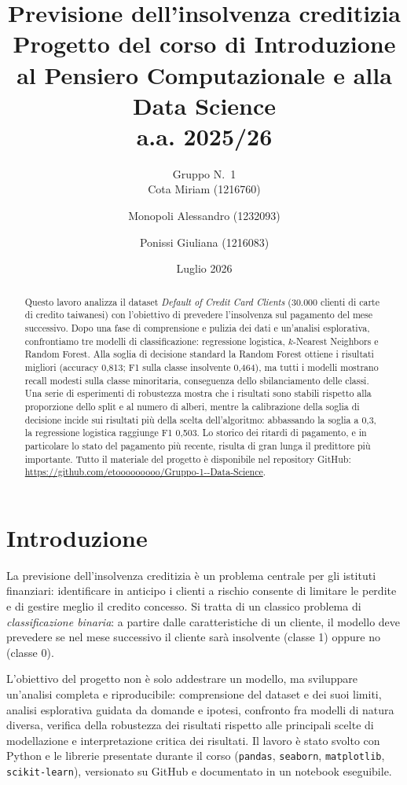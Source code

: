 \documentclass[11pt,a4paper]{article}
\title{Previsione dell'insolvenza creditizia\\
\large Progetto del corso di Introduzione al Pensiero Computazionale e alla Data Science\\
a.a. 2025/26}
\author{Gruppo N.~1\\[2pt]
\small Cota Miriam (1216760) \and \small Monopoli Alessandro (1232093) \and \small Ponissi Giuliana (1216083)}
\date{Luglio 2026}
\begin{document}
\maketitle

\begin{abstract}
Questo lavoro analizza il dataset \emph{Default of Credit Card Clients} (30.000 clienti di carte di credito taiwanesi) con l'obiettivo di prevedere l'insolvenza sul pagamento del mese successivo. Dopo una fase di comprensione e pulizia dei dati e un'analisi esplorativa, confrontiamo tre modelli di classificazione: regressione logistica, $k$-Nearest Neighbors e Random Forest. Alla soglia di decisione standard la Random Forest ottiene i risultati migliori (accuracy 0,813; F1 sulla classe insolvente 0,464), ma tutti i modelli mostrano recall modesti sulla classe minoritaria, conseguenza dello sbilanciamento delle classi. Una serie di esperimenti di robustezza mostra che i risultati sono stabili rispetto alla proporzione dello split e al numero di alberi, mentre la calibrazione della soglia di decisione incide sui risultati pi\`u della scelta dell'algoritmo: abbassando la soglia a 0,3, la regressione logistica raggiunge F1 0,503. Lo storico dei ritardi di pagamento, e in particolare lo stato del pagamento pi\`u recente, risulta di gran lunga il predittore pi\`u importante. Tutto il materiale del progetto \`e disponibile nel repository GitHub:\\
\url{https://github.com/etooooooooo/Gruppo-1--Data-Science}.
\end{abstract}

\section{Introduzione}

La previsione dell'insolvenza creditizia \`e un problema centrale per gli istituti finanziari: identificare in anticipo i clienti a rischio consente di limitare le perdite e di gestire meglio il credito concesso. Si tratta di un classico problema di \emph{classificazione binaria}: a partire dalle caratteristiche di un cliente, il modello deve prevedere se nel mese successivo il cliente sar\`a insolvente (classe 1) oppure no (classe 0).

L'obiettivo del progetto non \`e solo addestrare un modello, ma sviluppare un'analisi completa e riproducibile: comprensione del dataset e dei suoi limiti, analisi esplorativa guidata da domande e ipotesi, confronto fra modelli di natura diversa, verifica della robustezza dei risultati rispetto alle principali scelte di modellazione e interpretazione critica dei risultati. Il lavoro \`e stato svolto con Python e le librerie presentate durante il corso (\texttt{pandas}, \texttt{seaborn}, \texttt{matplotlib}, \texttt{scikit-learn}), versionato su GitHub e documentato in un notebook eseguibile.
\end{document}
